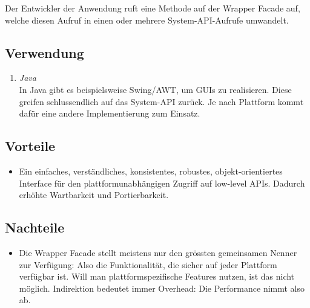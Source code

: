Der Entwickler der Anwendung ruft eine Methode auf der Wrapper Facade auf, welche diesen Aufruf in einen oder mehrere System-API-Aufrufe umwandelt.


\subsection*{Verwendung}

\begin{enumerate}
	\item \emph{Java}\\
	In Java gibt es beispielsweise Swing/AWT, um GUIs zu realisieren. Diese greifen schlussendlich auf das System-API zurück. Je nach Plattform kommt dafür eine andere Implementierung zum Einsatz.
\end{enumerate}


\subsection*{Vorteile}

\begin{itemize}
	\item Ein einfaches, verständliches, konsistentes, robustes, objekt-orientiertes Interface für den plattformunabhängigen Zugriff auf low-level APIs. Dadurch erhöhte Wartbarkeit und Portierbarkeit.
\end{itemize}


\subsection*{Nachteile}

\begin{itemize}
	\item Die Wrapper Facade stellt meistens nur den grössten gemeinsamen Nenner zur Verfügung: Also die Funktionalität, die sicher auf jeder Plattform verfügbar ist. Will man plattformspezifische Features nutzen, ist das nicht möglich. Indirektion bedeutet immer Overhead: Die Performance nimmt also ab.
\end{itemize}